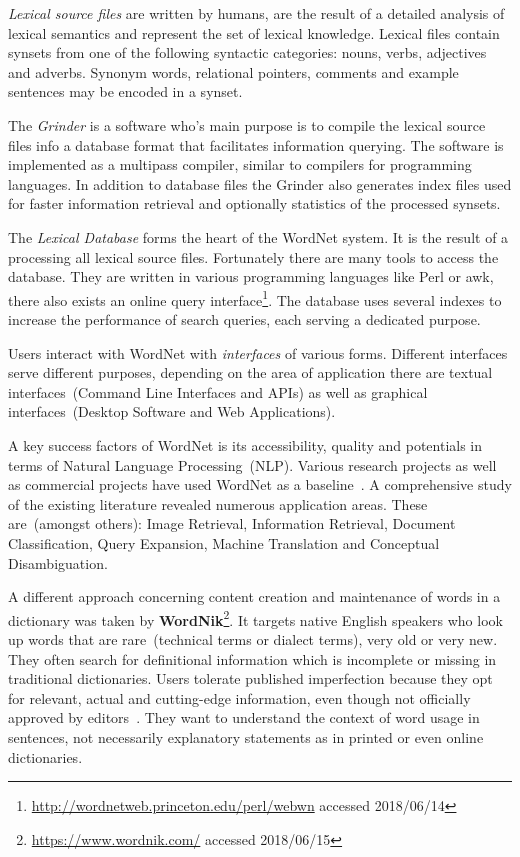 \documentclass[draft,final]{vutinfth} %
\begin{document}
\textit{Lexical source files} are written by humans, are the result of a detailed analysis of lexical semantics and represent the set of lexical knowledge. Lexical files contain synsets from one of the following syntactic categories: nouns, verbs, adjectives and adverbs. Synonym words, relational pointers, comments and example sentences may be encoded in a synset. 

The \textit{Grinder} is a software who's main purpose is to compile the lexical source files info a database format that facilitates information querying. 
The software is implemented as a multipass compiler, similar to compilers for programming languages. In addition to database files the Grinder also generates index files used for faster information retrieval and optionally statistics of the processed synsets.  

The \textit{Lexical Database} forms the heart of the WordNet system. It is the result of a processing all lexical source files. Fortunately there are many tools to access the database. They are written in various programming languages like Perl or awk, there also exists an online query interface\footnote{\url{http://wordnetweb.princeton.edu/perl/webwn} accessed 2018/06/14}. The database uses several indexes to increase the performance of search queries, each serving a dedicated purpose. 

Users interact with WordNet with \textit{interfaces} of various forms. Different interfaces serve different purposes, depending on the area of application there are textual interfaces~(Command Line Interfaces and APIs) as well as graphical interfaces~(Desktop Software and Web Applications). 

A key success factors of WordNet is its accessibility, quality and potentials in terms of Natural Language Processing~(NLP). Various research projects as well as commercial projects have used WordNet as a baseline~\cite{morato2004}. A comprehensive study of the existing literature revealed numerous application areas. These are~(amongst others): Image Retrieval, Information Retrieval, Document Classification, Query Expansion, Machine Translation and Conceptual Disambiguation.

A different approach concerning content creation and maintenance of words in a dictionary was taken by \textbf{WordNik}\footnote{\url{https://www.wordnik.com/} accessed 2018/06/15}. It targets native English speakers who look up words that are rare~(technical terms or dialect terms), very old or very new. They often search for definitional information which is incomplete or missing in traditional dictionaries. Users tolerate published imperfection because they opt for relevant, actual and cutting-edge information, even though not officially approved by editors~\cite{burnett1979}. They want to understand the context of word usage in sentences, not necessarily explanatory statements as in printed or even online dictionaries.
\end{document}
